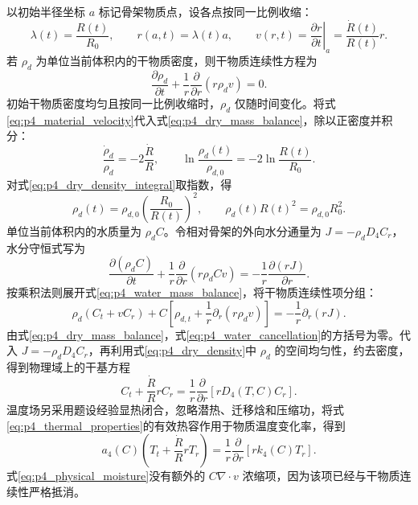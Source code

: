 \documentclass[withoutpreface,bwprint]{cumcmthesis}
\begin{document}
以初始半径坐标 $a$ 标记骨架物质点，设各点按同一比例收缩：
\begin{equation}
\lambda(t)=\frac{R(t)}{R_0},\qquad
r(a,t)=\lambda(t)a,\qquad
v(r,t)=\left.\frac{\partial r}{\partial t}\right|_a
=\frac{\dot R(t)}{R(t)}r.
\label{eq:p4_material_velocity}
\end{equation}
若 $\rho_d$ 为单位当前体积内的干物质密度，则干物质连续性方程为
\begin{equation}
\frac{\partial\rho_d}{\partial t}
+\frac{1}{r}\frac{\partial}{\partial r}(r\rho_dv)=0.
\label{eq:p4_dry_mass_balance}
\end{equation}
初始干物质密度均匀且按同一比例收缩时，$\rho_d$ 仅随时间变化。将式\eqref{eq:p4_material_velocity}代入式\eqref{eq:p4_dry_mass_balance}，除以正密度并积分：
\begin{equation}
\frac{\dot\rho_d}{\rho_d}=-2\frac{\dot R}{R},
\qquad
\ln\frac{\rho_d(t)}{\rho_{d,0}}=-2\ln\frac{R(t)}{R_0}.
\label{eq:p4_dry_density_integral}
\end{equation}
对式\eqref{eq:p4_dry_density_integral}取指数，得
\begin{equation}
\rho_d(t)=\rho_{d,0}\left(\frac{R_0}{R(t)}\right)^2,
\qquad \rho_d(t)R(t)^2=\rho_{d,0}R_0^2.
\label{eq:p4_dry_density}
\end{equation}
单位当前体积内的水质量为 $\rho_dC$。令相对骨架的外向水分通量为 $J=-\rho_dD_4C_r$，水分守恒式写为
\begin{equation}
\frac{\partial(\rho_dC)}{\partial t}
+\frac{1}{r}\frac{\partial}{\partial r}(r\rho_dCv)
=-\frac{1}{r}\frac{\partial(rJ)}{\partial r}.
\label{eq:p4_water_mass_balance}
\end{equation}
按乘积法则展开式\eqref{eq:p4_water_mass_balance}，将干物质连续性项分组：
\begin{equation}
\rho_d(C_t+vC_r)
+C\left[\rho_{d,t}+\frac1r\partial_r(r\rho_dv)\right]
=-\frac1r\partial_r(rJ).
\label{eq:p4_water_cancellation}
\end{equation}
由式\eqref{eq:p4_dry_mass_balance}，式\eqref{eq:p4_water_cancellation}的方括号为零。代入 $J=-\rho_dD_4C_r$，再利用式\eqref{eq:p4_dry_density}中 $\rho_d$ 的空间均匀性，约去密度，得到物理域上的干基方程
\begin{equation}
C_t+\frac{\dot R}{R}rC_r
=\frac{1}{r}\frac{\partial}{\partial r}\left[rD_4(T,C)C_r\right].
\label{eq:p4_physical_moisture}
\end{equation}
温度场另采用题设经验显热闭合，忽略潜热、迁移焓和压缩功，将式\eqref{eq:p4_thermal_properties}的有效热容作用于物质温度变化率，得到
\begin{equation}
a_4(C)\left(T_t+\frac{\dot R}{R}rT_r\right)
=\frac{1}{r}\frac{\partial}{\partial r}\left[rk_4(C)T_r\right].
\label{eq:p4_physical_heat}
\end{equation}
式\eqref{eq:p4_physical_moisture}没有额外的 $C\nabla\!\cdot v$ 浓缩项，因为该项已经与干物质连续性严格抵消。
\end{document}
